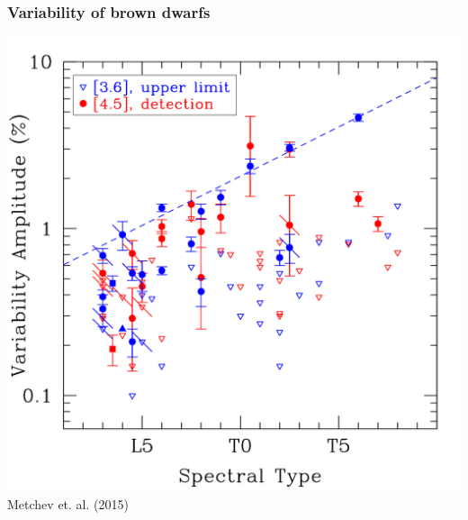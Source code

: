 \documentclass[14pt]{beamer}
\newcommand*\figcite[1]{\vspace*{\fill}\raggedleft\footnotesize{#1}}
\begin{document}
\begin{frame}
  \frametitle{Variability of brown dwarfs}
  \centering
  \includegraphics[height=0.8\textheight]{bdVariability}\\
  \figcite{Metchev et. al. (2015)}
\end{frame}
\end{document}
